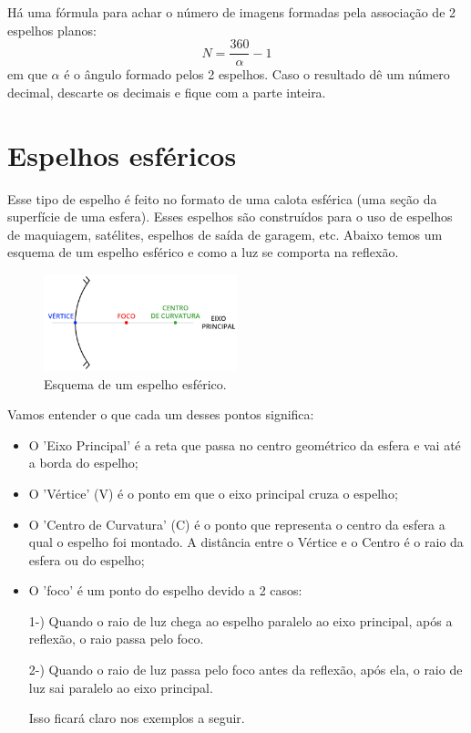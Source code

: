 \documentclass[12pt]{extarticle}
\newcommand{\<}{\langle}
\renewcommand{\>}{\rangle}
\theoremstyle{definition}
\begin{document}
Há uma fórmula para achar o número de imagens formadas pela associação de 2 espelhos planos:
\begin{equation}
    N = \frac{360}{\alpha} -1
\end{equation}
\noindent em que $\alpha$ é o ângulo formado pelos 2 espelhos. Caso o resultado dê um número decimal, descarte os decimais e fique com a parte inteira.

\section{Espelhos esféricos}

Esse tipo de espelho é feito no formato de uma calota esférica (uma seção da superfície de uma esfera). Esses espelhos são construídos para o uso de espelhos de maquiagem, satélites, espelhos de saída de garagem, etc. Abaixo temos um esquema de um espelho esférico e como a luz se comporta na reflexão.
\begin{figure}[H]
    \centering
    \includegraphics[width=0.5\textwidth]{esferico_1.jpg}
    \caption{Esquema de um espelho esférico.}
    \label{fig:esferico}
\end{figure}

Vamos entender o que cada um desses pontos significa:
\begin{itemize}
    \item O 'Eixo Principal' é a reta que passa no centro geométrico da esfera e vai até a borda do espelho;
    \item O 'Vértice' (V) é o ponto em que o eixo principal cruza o espelho;
    \item O 'Centro de Curvatura' (C) é o ponto que representa o centro da esfera a qual o espelho foi montado. A distância entre o Vértice e o Centro é o raio da esfera ou do espelho;
    \item O 'foco' é um ponto do espelho devido a 2 casos:
    
    1-) Quando o raio de luz chega ao espelho paralelo ao eixo principal, após a reflexão, o raio passa pelo foco.
    
    2-) Quando o raio de luz passa pelo foco antes da reflexão, após ela, o raio de luz sai paralelo ao eixo principal.
    
    Isso ficará claro nos exemplos a seguir.
\end{itemize}
\end{document}
